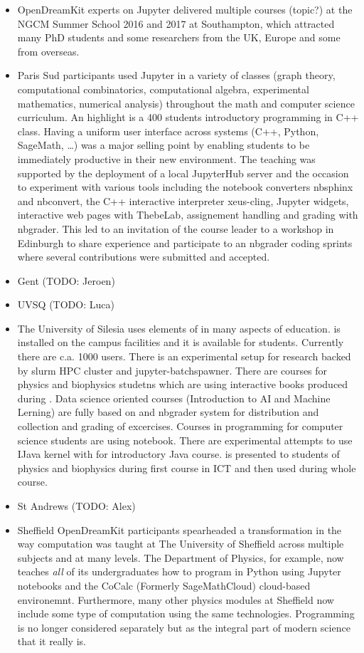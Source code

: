 \documentclass{deliverablereport}
\begin{document}
\begin{itemize}
\item
  OpenDreamKit experts on Jupyter delivered multiple courses (topic?) at
  the NGCM Summer School 2016 and 2017 at Southampton, which attracted
  many PhD students and some researchers from the UK, Europe and some
  from overseas.
\item
  Paris Sud participants used Jupyter in a variety of classes (graph
  theory, computational combinatorics, computational algebra,
  experimental mathematics, numerical analysis) throughout the math and
  computer science curriculum. An highlight is a 400 students
  introductory programming in C++ class. Having a uniform user interface
  across systems (C++, Python, SageMath, \ldots) was a major selling
  point by enabling students to be immediately productive in their new
  environment. The teaching was supported by the deployment of a local
  JupyterHub server and the occasion to experiment with various tools
  including the notebook converters nbsphinx and nbconvert, the C++
  interactive interpreter xeus-cling, Jupyter widgets, interactive web
  pages with ThebeLab, assignement handling and grading with nbgrader.
  This led to an invitation of the course leader to a workshop in
  Edinburgh to share experience and participate to an nbgrader coding
  sprints where several contributions were submitted and accepted.
\item
  Gent (TODO: Jeroen)
\item
  UVSQ (TODO: Luca)
\item
  The University of Silesia uses elements of \ODK in many aspects of
  education. \Jupyterhub is installed on the campus facilities and it
  is available for students. Currently there are c.a. 1000
  users. There is an experimental setup for research backed by slurm
  HPC cluster and jupyter-batchspawner. There are courses for physics
  and biophysics studetns which are using interactive books produced
  during \ODK. Data science oriented courses (Introduction to AI and
  Machine Lerning) are fully based on \Jupyter and nbgrader system for
  distribution and collection and grading of excercises. Courses in
  \Python programming for computer science students are using \Juptyer
  notebook. There are experimental attempts to use IJava kernel with
  \Jupyter for introductory Java course. \SageMath is presented to
  students of physics and biophysics during first course in ICT and
  then used during whole course. 
\item
  St Andrews (TODO: Alex)
\item
  Sheffield OpenDreamKit participants spearheaded a transformation in
  the way computation was taught at The University of Sheffield across
  multiple subjects and at many levels. The Department of Physics, for
  example, now teaches \emph{all} of its undergraduates how to program
  in Python using Jupyter notebooks and the CoCalc (Formerly
  SageMathCloud) cloud-based environemnt. Furthermore, many other
  physics modules at Sheffield now include some type of computation
  using the same technologies. Programming is no longer considered
  separately but as the integral part of modern science that it really
  is.


\end{itemize}
\end{document}

